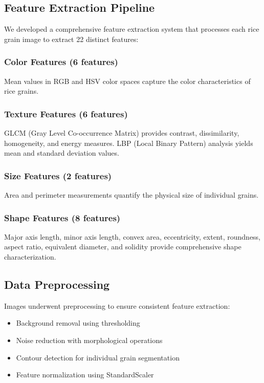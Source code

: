 \documentclass[conference]{IEEEtran}
\begin{document}
\subsection{Feature Extraction Pipeline}

We developed a comprehensive feature extraction system that processes each rice grain image to extract 22 distinct features:

\subsubsection{Color Features (6 features)}
Mean values in RGB and HSV color spaces capture the color characteristics of rice grains.

\subsubsection{Texture Features (6 features)}
GLCM (Gray Level Co-occurrence Matrix) provides contrast, dissimilarity, homogeneity, and energy measures. LBP (Local Binary Pattern) analysis yields mean and standard deviation values.

\subsubsection{Size Features (2 features)}
Area and perimeter measurements quantify the physical size of individual grains.

\subsubsection{Shape Features (8 features)}
Major axis length, minor axis length, convex area, eccentricity, extent, roundness, aspect ratio, equivalent diameter, and solidity provide comprehensive shape characterization.

\subsection{Data Preprocessing}

Images underwent preprocessing to ensure consistent feature extraction:
\begin{itemize}
    \item Background removal using thresholding
    \item Noise reduction with morphological operations
    \item Contour detection for individual grain segmentation
    \item Feature normalization using StandardScaler
\end{itemize}
\end{document}
